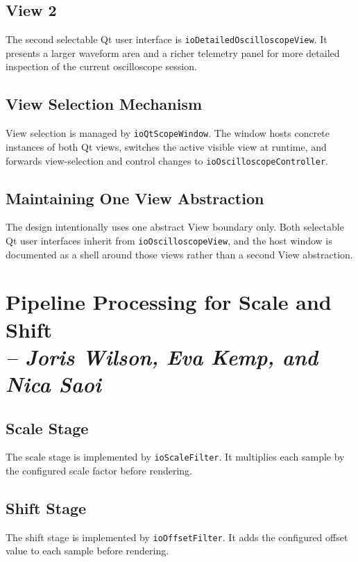     \subsection{View 2}
    The second selectable Qt user interface is \texttt{ioDetailedOscilloscopeView}. It presents a larger waveform area and a richer telemetry panel for more detailed inspection of the current oscilloscope session.

    \subsection{View Selection Mechanism}
    View selection is managed by \texttt{ioQtScopeWindow}. The window hosts concrete instances of both Qt views, switches the active visible view at runtime, and forwards view-selection and control changes to \texttt{ioOscilloscopeController}.

    \subsection{Maintaining One View Abstraction}
    The design intentionally uses one abstract View boundary only. Both selectable Qt user interfaces inherit from \texttt{ioOscilloscopeView}, and the host window is documented as a shell around those views rather than a second View abstraction.

    \section{Pipeline Processing for Scale and Shift \\
    \small{\textit{-- Joris Wilson, Eva Kemp, and Nica Saoi}}}
    \label{Section::Pipeline Processing for Scale and Shift}

    \subsection{Scale Stage}
    The scale stage is implemented by \texttt{ioScaleFilter}. It multiplies each sample by the configured scale factor before rendering.

    \subsection{Shift Stage}
    The shift stage is implemented by \texttt{ioOffsetFilter}. It adds the configured offset value to each sample before rendering.

